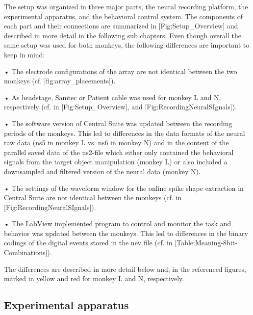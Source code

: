 The setup was organized in three major parts, the neural recording platform, the experimental apparatus, and the behavioral control system. The components of each part and their connections are summarized in [Fig:Setup\_Overview] and described in more detail in the following sub chapters. Even though overall the same setup was used for both monkeys, the following differences are important to keep in mind: 

• The electrode configurations of the array are not identical between the two monkeys (cf. [fig:array\_placements]).

• As headstage, Samtec or Patient cable was used for monkey L and N, respectively (cf. in [Fig:Setup\_Overview], and [Fig:RecordingNeuralSIgnals]).

• The software version of Central Suite was updated between the recording periods of the monkeys. This led to differences in the data formats of the neural raw data (ns5 in monkey L vs. ns6 in monkey N) and in the content of the parallel saved data of the ns2-file which either only contained the behavioral signals from the target object manipulation (monkey L) or also included a downsampled and filtered version of the neural data (monkey N).

• The settings of the waveform window for the online spike shape extraction in Central Suite are not identical between the monkeys (cf. in [Fig:RecordingNeuralSIgnals]).

• The LabView implemented program to control and monitor the task and behavior was updated between the monkeys. This led to differences in the binary codings of the digital events stored in the nev file (cf. in [Table:Meaning-8bit-Combinations]).

The differences are described in more detail below and, in the referenced figures, marked in yellow and red for monkey L and N, respectively. 



\subsection{Experimental apparatus}

